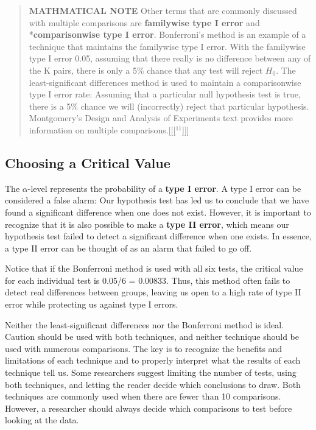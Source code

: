 \documentclass[
]{book}
\begin{document}
\begin{quote}
\textbf{MATHMATICAL NOTE} Other terms that are commonly discussed with multiple comparisons are \textbf{familywise type I error} and *\textbf{comparisonwise type I error}. Bonferroni's method is an example of a technique that maintains the familywise type I error. With the familywise type I error 0.05, assuming that there really is no difference between any of the K pairs, there is only a 5\% chance that any test will reject \(H_0\). The least-significant differences method is used to maintain a comparisonwise type I error rate: Assuming that a particular null hypothesis test is true, there is a 5\% chance we will (incorrectly) reject that particular hypothesis. Montgomery's Design and Analysis of Experiments text provides more information on multiple comparisons.{[}{[}{[}\(^{11}\){]}{]}{]}
\end{quote}

\hypertarget{choosing-a-critical-value}{%
\subsection*{Choosing a Critical Value}\label{choosing-a-critical-value}}

The \(\alpha\)-level represents the probability of a \textbf{type I error}. A type I error can be considered a false alarm: Our hypothesis test has led us to conclude that we have found a significant difference when one does not exist. However, it is important to recognize that it is also possible to make a \textbf{type II error}, which means our hypothesis test failed to detect a significant difference when one exists. In essence, a type II error can be thought of as an alarm that failed to go off.

Notice that if the Bonferroni method is used with all six tests, the critical value for each individual test is 0.05/6 = 0.00833. Thus, this method often fails to detect real differences between groups, leaving us open to a high rate of type II error while protecting us against type I errors.

Neither the least-significant differences nor the Bonferroni method is ideal. Caution should be used with both techniques, and neither technique should be used with numerous comparisons. The key is to recognize the benefits and limitations of each technique and to properly interpret what the results of each technique tell us. Some researchers suggest limiting the number of tests, using both techniques, and letting the reader decide which conclusions to draw. Both techniques are commonly used when there are fewer than 10 comparisons. However, a researcher should always decide which comparisons to test before looking at the data.
\end{document}
